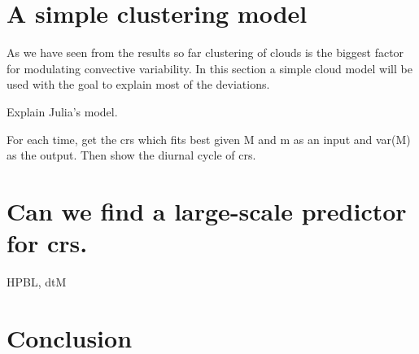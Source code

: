 \documentclass[a4paper, 12pt]{article}
\begin{document}


\section{A simple clustering model}

As we have seen from the results so far clustering of clouds is the biggest factor for modulating convective variability. In this section a simple cloud model will be used with the goal to explain most of the deviations.

Explain Julia's model.

For each time, get the crs which fits best given M and m as an input and var(M) as the output. Then show the diurnal cycle of crs.

\section{Can we find a large-scale predictor for crs.}

HPBL, dtM


\section{Conclusion}
\end{document}
